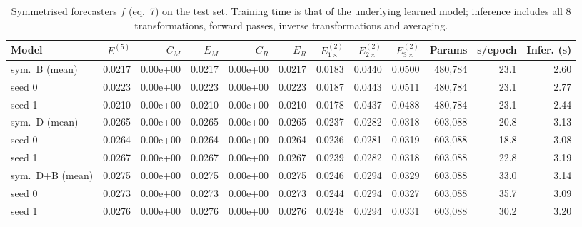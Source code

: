 \begin{table}[H]\centering\scriptsize\setlength{\tabcolsep}{2.5pt}
\caption{Symmetrised forecasters $\bar f$ (eq.~7) on the test set. Training time is that of the underlying learned model; inference includes all 8 transformations, forward passes, inverse transformations and averaging.}\label{tab:t6}
\begin{tabular}{lrrrrrrrrrrr}\toprule
Model & $E^{(5)}$ & $C_M$ & $E_M$ & $C_R$ & $E_R$ & $E^{(2)}_{1\times}$ & $E^{(2)}_{2\times}$ & $E^{(2)}_{3\times}$ & Params & s/epoch & Infer. (s) \\ \midrule
sym.\ B (mean) & 0.0217 & 0.00e+00 & 0.0217 & 0.00e+00 & 0.0217 & 0.0183 & 0.0440 & 0.0500 & 480{,}784 & 23.1 & 2.60 \\
\quad seed 0 & 0.0223 & 0.00e+00 & 0.0223 & 0.00e+00 & 0.0223 & 0.0187 & 0.0443 & 0.0511 & 480{,}784 & 23.1 & 2.77 \\
\quad seed 1 & 0.0210 & 0.00e+00 & 0.0210 & 0.00e+00 & 0.0210 & 0.0178 & 0.0437 & 0.0488 & 480{,}784 & 23.1 & 2.44 \\
\midrule
sym.\ D (mean) & 0.0265 & 0.00e+00 & 0.0265 & 0.00e+00 & 0.0265 & 0.0237 & 0.0282 & 0.0318 & 603{,}088 & 20.8 & 3.13 \\
\quad seed 0 & 0.0264 & 0.00e+00 & 0.0264 & 0.00e+00 & 0.0264 & 0.0236 & 0.0281 & 0.0319 & 603{,}088 & 18.8 & 3.08 \\
\quad seed 1 & 0.0267 & 0.00e+00 & 0.0267 & 0.00e+00 & 0.0267 & 0.0239 & 0.0282 & 0.0318 & 603{,}088 & 22.8 & 3.19 \\
\midrule
sym.\ D+B (mean) & 0.0275 & 0.00e+00 & 0.0275 & 0.00e+00 & 0.0275 & 0.0246 & 0.0294 & 0.0329 & 603{,}088 & 33.0 & 3.14 \\
\quad seed 0 & 0.0273 & 0.00e+00 & 0.0273 & 0.00e+00 & 0.0273 & 0.0244 & 0.0294 & 0.0327 & 603{,}088 & 35.7 & 3.09 \\
\quad seed 1 & 0.0276 & 0.00e+00 & 0.0276 & 0.00e+00 & 0.0276 & 0.0248 & 0.0294 & 0.0331 & 603{,}088 & 30.2 & 3.20 \\
\bottomrule\end{tabular}
\end{table}